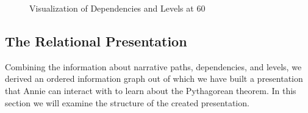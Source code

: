 \documentclass[twoside, 12pt]{article}
\begin{document}
\begin{figure}
\vspace{-26pt}
  \begin{center}
\vspace{-5pt}
  \caption [Caption for LOF]{Visualization of Dependencies and Levels at 60\degree\ \footnotemark}
  \label{fig:visualDependencyDegree}
\vspace{-24pt}
  \end{center}
\end{figure}

\begin{figure}
\vspace{-50pt}
\end{figure}


\subsection{The Relational Presentation}
\label{sec:RelationalPresentations}

Combining the information about narrative paths, dependencies, and levels, we derived an ordered information graph out of which we have built a presentation that Annie can interact with to learn about the Pythagorean theorem. In this section we will examine the structure of the created presentation.\\
\end{document}
